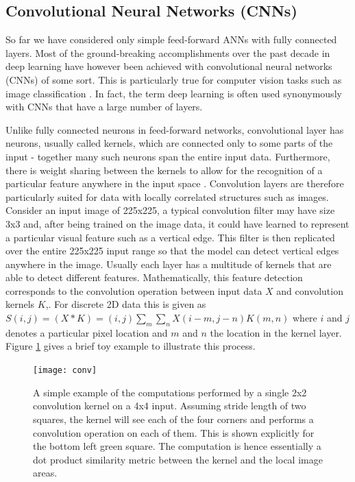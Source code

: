 \documentclass[12pt]{report}
\begin{document}
\subsection{Convolutional Neural Networks (CNNs)}

So far we have considered only simple feed-forward ANNs with fully connected layers. Most of the ground-breaking accomplishments over the past decade in deep learning have however been achieved with convolutional neural networks (CNNs) \cite{Le} of some sort. This is particularly true for computer vision tasks such as image classification \cite{JurgenSchmidhuber2015}. In fact, the term deep learning is often used synonymously with CNNs that have a large number of layers.

Unlike fully connected neurons in feed-forward networks, convolutional layer has neurons, usually called kernels, which are connected only to some parts of the input - together many such neurons span the entire input data. Furthermore, there is weight sharing between the kernels to allow for the recognition of a particular feature anywhere in the input space \cite{Lecun2015}. Convolution layers are therefore particularly suited for data with locally correlated structures such as images. Consider an input image of 225x225, a typical convolution filter may have size 3x3 and, after being trained on the image data, it could have learned to represent a particular visual feature such as a vertical edge. This filter is then replicated over the entire 225x225 input range so that the model can detect vertical edges anywhere in the image. Usually each layer has a multitude of kernels that are able to detect different features. Mathematically, this feature detection corresponds to the convolution operation between input data $X$ and convolution kernels $K$,. For discrete 2D data  this is given as $S(i, j) = (X \ast K)=(i, j) \sum_m \sum_n X(i-m, j-n)K(m, n)$ \cite{Goodfellow2016} where $i$ and $j$ denotes a particular pixel location and $m$ and $n$ the location in the kernel layer. Figure \ref{fig:conv} gives a brief toy example to illustrate this process. 
  
\begin{figure}
  \centering
	\texttt{[image: conv]}
	\caption{A simple example of the computations performed by a single 2x2 convolution kernel on a 4x4 input. Assuming stride length of two squares, the kernel will see each of the four corners and performs a convolution operation on each of them. This is shown explicitly for the bottom left green square. The computation is hence essentially a dot product similarity metric between the kernel and the local image areas.}
	\label{fig:conv}
\end{figure}
\end{document}
